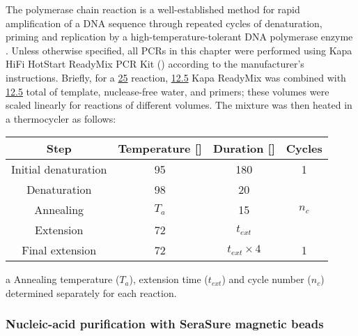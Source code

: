 The polymerase chain reaction is a well-established method for rapid amplification of a DNA sequence through repeated cycles of denaturation, priming and replication by a high-temperature-tolerant DNA polymerase enzyme \parencite{paul2010hotstartpcr}. Unless otherwise specified, all PCRs in this chapter were performed using  Kapa HiFi HotStart ReadyMix PCR Kit () according to the manufacturer's instructions. Briefly, for a \ul{25} reaction, \ul{12.5} Kapa ReadyMix was combined with \ul{12.5} total of template, nuclease-free water, and primers; these volumes were scaled linearly for reactions of different volumes. The mixture was then heated in a thermocycler as follows:

\begin{center}
\begin{threeparttable}
\begin{tabular}{cccc}\toprule
\textbf{Step} & \textbf{Temperature [\degC{}]} & \textbf{Duration [\secs{}]} & \textbf{Cycles}\\\midrule
Initial denaturation & 95 & 180 & 1 \\\midrule
Denaturation & 98 & 20 & \multirow{3}{*}{$n_c$\tnote{a}}\\
Annealing & $T_a$\tnote{a} \tnote{} & 15 & \\
Extension & 72 & $t_{ext}$\tnote{a} & \\\midrule
Final extension & 72 & $t_{ext} \times 4$\tnote{a} & 1\\
\bottomrule\end{tabular}
\begin{tablenotes}
\item[a] Annealing temperature ($T_a$), extension time ($t_{ext}$) and cycle number ($n_c$) determined separately for each reaction.
\end{tablenotes}
\end{threeparttable}
\end{center}

\subsubsection{Nucleic-acid purification with SeraSure magnetic beads}
\label{sec:methods_molec_standard_serasure}

